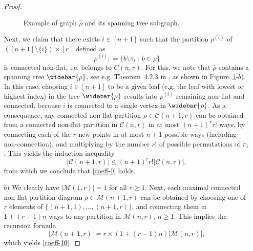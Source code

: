 \documentclass[bj,authoryear,noshowframe]{imsart}
\theoremstyle{plain}
\theoremstyle{remark}
\begin{document}
\begin{proof}
\begin{figure}[H]
{{%
 }
     }
     \caption{Example of graph $\widehat{\rho}$ and its spanning tree subgraph.}
 \label{fig:diagram0-11}
 \end{figure}
 
 \vspace{-0.8cm}
   
 \noindent
  Next, we claim that
  there exists $i\in [n+1]$ such that the partition ${\rho}^{(i)}$
  of $([n+1] \setminus \{i\} ) \times [r]$ 
  defined as 
  $$
  {\rho}^{(i)} : = \{ b \setminus \pi_i \ : \ b\in \rho \}
  $$
  is connected non-flat, i.e. belongs to $C(n,r)$.
  For this, we note that $\widehat{\rho}$ contains a spanning
  tree $\widebar{\rho}$, see e.g. Theorem~4.2.3 in \cite{balakrishnan},
  as shown in Figure~\ref{fig:diagram0-11}-$b)$. 
  In this case, choosing $i\in [n+1]$ to be a given leaf
  (e.g. the leaf with lowest or highest index)
  in the tree $\widebar{\rho}$
  results into ${\rho}^{(i)}$ remaining non-flat and connected,
  because $i$ is connected to a single vertex in $\widebar{\rho}$.
  As a consequence, any connected non-flat partition
  $\rho \in \mathcal{C}(n+1,r)$ can be
  obtained from a connected non-flat partition in $\mathcal{C}(n,r)$ in at most
  $(n+1)^r r!$ ways, by connecting each of the $r$ new points
  in at most $n+1$ possible ways (including non-connection),
  and multiplying by the number $r!$ of possible permutations of $\pi_i$. 
  This yields the induction inequality 
  $$
  |\mathcal{C} (n+1,r) | \leq (n+1)^r r! |\mathcal{C} (n,r) |,
  $$
  from which we conclude that \eqref{coeff-0} holds. 
  
 
  \noindent
  $b)$ 
  We clearly have $|\mathcal{M}(1,r)|=1$ for all $r\geq 1$. 
  Next, each maximal connected non-flat partition diagram
  $\rho\in\mathcal{M}(n+1,r)$ can be
    obtained by choosing 
    one of $r$ elements of $\{(n+1,1),\dots,(n+1,r)\}$, 
    and connecting them in $1+(r-1)n$ ways 
    to any partition in $\mathcal{M}(n,r)$, $n\geq 1$.
    This implies the recursion formula 
    $$|\mathcal{M}(n+1,r)|=r\times (1+(r-1)n)|\mathcal{M}(n,r)|,
    $$
  which yields \eqref{coeff-10}.
 \end{proof} 
 
\end{document}
